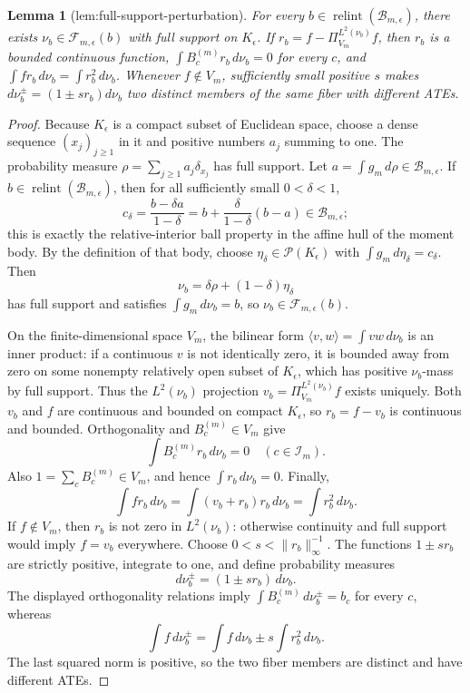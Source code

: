 \documentclass{article}
\newtheorem{lemma}{Lemma}
\begin{document}
\begin{lemma}[lem:full-support-perturbation]\label{lem:full-support-perturbation}
For every \(b\in\operatorname{relint}(\mathcal B_{m,\epsilon})\), there exists \(\nu_b\in\mathcal F_{m,\epsilon}(b)\) with full support on \(K_{\epsilon}\). If \(r_b=f-\Pi_{V_m}^{L^2(\nu_b)}f\), then \(r_b\) is a bounded continuous function, \(\int B_c^{(m)}r_b\,d\nu_b=0\) for every \(c\), and \(\int fr_b\,d\nu_b=\int r_b^2\,d\nu_b\). Whenever \(f\notin V_m\), sufficiently small positive \(s\) makes \(d\nu_b^{\pm}=(1\pm sr_b)d\nu_b\) two distinct members of the same fiber with different ATEs.
\end{lemma}
\begin{proof}
Because \(K_{\epsilon}\) is a compact subset of Euclidean space, choose a dense sequence \((x_j)_{j\geq1}\) in it and positive numbers \(a_j\) summing to one.  The probability measure \(\rho=\sum_{j\geq1}a_j\delta_{x_j}\) has full support.  Let \(a=\int g_m\,d\rho\in\mathcal B_{m,\epsilon}\).  If \(b\in\operatorname{relint}(\mathcal B_{m,\epsilon})\), then for all sufficiently small \(0<\delta<1\),
\[
 c_{\delta}=\frac{b-\delta a}{1-\delta}
 =b+\frac{\delta}{1-\delta}(b-a)
 \in\mathcal B_{m,\epsilon};
\]
this is exactly the relative-interior ball property in the affine hull of the moment body.  By the definition of that body, choose \(\eta_{\delta}\in\mathcal P(K_{\epsilon})\) with \(\int g_m\,d\eta_{\delta}=c_{\delta}\).  Then
\[
 \nu_b=\delta\rho+(1-\delta)\eta_{\delta}
\]
has full support and satisfies \(\int g_m\,d\nu_b=b\), so \(\nu_b\in\mathcal F_{m,\epsilon}(b)\).

On the finite-dimensional space \(V_m\), the bilinear form \(\langle v,w\rangle=\int vw\,d\nu_b\) is an inner product: if a continuous \(v\) is not identically zero, it is bounded away from zero on some nonempty relatively open subset of \(K_{\epsilon}\), which has positive \(\nu_b\)-mass by full support.  Thus the \(L^2(\nu_b)\) projection \(v_b=\Pi_{V_m}^{L^2(\nu_b)}f\) exists uniquely.  Both \(v_b\) and \(f\) are continuous and bounded on compact \(K_{\epsilon}\), so \(r_b=f-v_b\) is continuous and bounded.  Orthogonality and \(B_c^{(m)}\in V_m\) give
\[
 \int B_c^{(m)}r_b\,d\nu_b=0\quad(c\in\mathcal I_m).
\]
Also \(1=\sum_cB_c^{(m)}\in V_m\), and hence \(\int r_b\,d\nu_b=0\).  Finally,
\[
 \int fr_b\,d\nu_b
 =\int(v_b+r_b)r_b\,d\nu_b
 =\int r_b^2\,d\nu_b.
\]
If \(f\notin V_m\), then \(r_b\) is not zero in \(L^2(\nu_b)\): otherwise continuity and full support would imply \(f=v_b\) everywhere.  Choose \(0<s<\|r_b\|_{\infty}^{-1}\).  The functions \(1\pm sr_b\) are strictly positive, integrate to one, and define probability measures
\[
 d\nu_b^{\pm}=(1\pm sr_b)\,d\nu_b.
\]
The displayed orthogonality relations imply \(\int B_c^{(m)}\,d\nu_b^{\pm}=b_c\) for every \(c\), whereas
\[
 \int f\,d\nu_b^{\pm}
 =\int f\,d\nu_b\pm s\int r_b^2\,d\nu_b.
\]
The last squared norm is positive, so the two fiber members are distinct and have different ATEs.
\end{proof}
\end{document}
